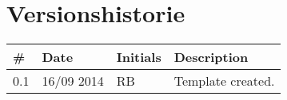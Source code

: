 \documentclass[Main]{subfiles}
\begin{document}
\section*{Versionshistorie}

\begin{tabular}{p{} p{} p{} p{}}
\hline

\textbf{\#} & \textbf{Date} & \textbf{Initials} & \textbf{Description} \\ \hline

\rowcolor{gr}0.1 & 16/09 2014 & RB & Template created. \\ 

\hline

\end{tabular} 
\end{document}
